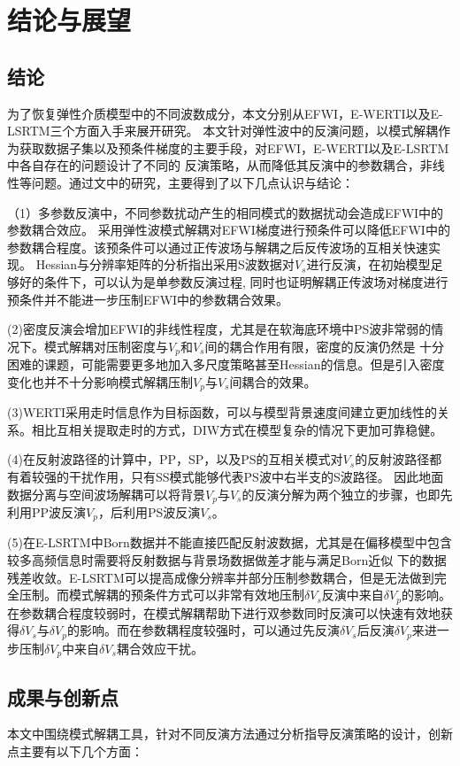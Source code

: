 \chapter{结论与展望}
\section{结论}
为了恢复弹性介质模型中的不同波数成分，本文分别从EFWI，E-WERTI以及E-LSRTM三个方面入手来展开研究。
本文针对弹性波中的反演问题，以模式解耦作为获取数据子集以及预条件梯度的主要手段，对EFWI，E-WERTI以及E-LSRTM中各自存在的问题设计了不同的
反演策略，从而降低其反演中的参数耦合，非线性等问题。通过文中的研究，主要得到了以下几点认识与结论：

（1）多参数反演中，不同参数扰动产生的相同模式的数据扰动会造成EFWI中的参数耦合效应。
采用弹性波模式解耦对EFWI梯度进行预条件可以降低EFWI中的参数耦合程度。该预条件可以通过正传波场与解耦之后反传波场的互相关快速实现。
Hessian与分辨率矩阵的分析指出采用S波数据对$V_s$进行反演，在初始模型足够好的条件下，可以认为是单参数反演过程,
同时也证明解耦正传波场对梯度进行预条件并不能进一步压制EFWI中的参数耦合效果。

(2)密度反演会增加EFWI的非线性程度，尤其是在软海底环境中PS波非常弱的情况下。模式解耦对压制密度与$V_p$和$V_s$间的耦合作用有限，密度的反演仍然是
十分困难的课题，可能需要更多地加入多尺度策略甚至Hessian的信息。但是引入密度变化也并不十分影响模式解耦压制$V_p$与$V_s$间耦合的效果。

(3)WERTI采用走时信息作为目标函数，可以与模型背景速度间建立更加线性的关系。相比互相关提取走时的方式，DIW方式在模型复杂的情况下更加可靠稳健。

(4)在反射波路径的计算中，PP，SP，以及PS的互相关模式对$V_s$的反射波路径都有着较强的干扰作用，只有SS模式能够代表PS波中右半支的S波路径。
因此地面数据分离与空间波场解耦可以将背景$V_p$与$V_s$的反演分解为两个独立的步骤，也即先利用PP波反演$V_p$，后利用PS波反演$V_s$。

(5)在E-LSRTM中Born数据并不能直接匹配反射波数据，尤其是在偏移模型中包含较多高频信息时需要将反射数据与背景场数据做差才能与满足Born近似
下的数据残差收敛。E-LSRTM可以提高成像分辨率并部分压制参数耦合，但是无法做到完全压制。而模式解耦的预条件方式可以非常有效地压制$\delta
V_s$反演中来自$\delta V_p$的影响。
在参数耦合程度较弱时，在模式解耦帮助下进行双参数同时反演可以快速有效地获得$\delta
V_s$与$\delta V_p$的影响。而在参数耦程度较强时，可以通过先反演$\delta V_s$后反演$\delta
V_p$来进一步压制$\delta V_p$中来自$\delta V_s$耦合效应干扰。
\section{成果与创新点}
本文中围绕模式解耦工具，针对不同反演方法通过分析指导反演策略的设计，创新点主要有以下几个方面：

